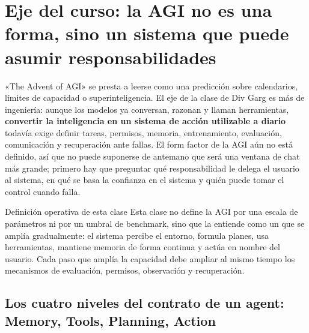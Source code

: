 \section{Eje del curso: la AGI no es una forma, sino un sistema que puede asumir responsabilidades}

«The Advent of AGI» se presta a leerse como una predicción sobre calendarios, límites de capacidad o superinteligencia. El eje de la clase de Div Garg es más de ingeniería: aunque los modelos ya conversan, razonan y llaman herramientas, \textbf{convertir la inteligencia en un sistema de acción utilizable a diario} todavía exige definir tareas, permisos, memoria, entrenamiento, evaluación, comunicación y recuperación ante fallas. El form factor de la AGI aún no está definido, así que no puede suponerse de antemano que será una ventana de chat más grande; primero hay que preguntar qué responsabilidad le delega el usuario al sistema, en qué se basa la confianza en el sistema y quién puede tomar el control cuando falla.




\begin{importantbox}{Definición operativa de esta clase}
Esta clase no define la AGI por una escala de parámetros ni por un umbral de benchmark, sino que la entiende como un  que se amplía gradualmente: el sistema percibe el entorno, formula planes, usa herramientas, mantiene memoria de forma continua y actúa en nombre del usuario. Cada paso que amplía la capacidad debe ampliar al mismo tiempo los mecanismos de evaluación, permisos, observación y recuperación.
\end{importantbox}

\subsection{Los cuatro niveles del contrato de un agent: Memory, Tools, Planning, Action}

